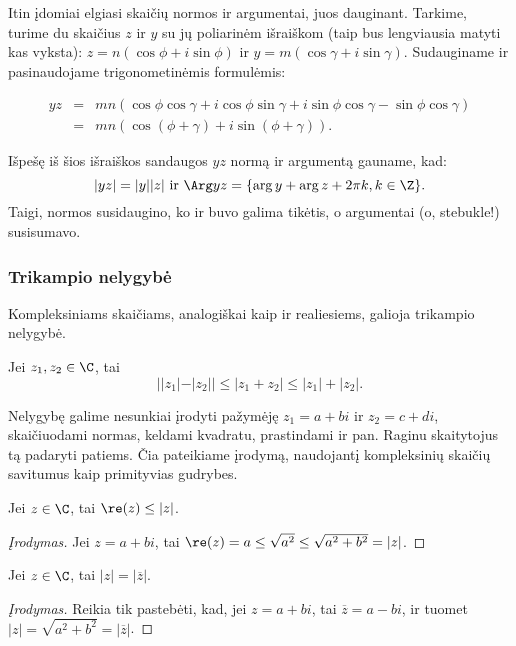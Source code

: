 Itin įdomiai elgiasi skaičių normos ir argumentai, juos dauginant. Tarkime, turime du skaičius $z$ ir $y$ su jų poliarinėm išraiškom (taip bus lengviausia matyti kas vyksta): $z=n(\cos\phi+i\sin\phi)$ ir $y=m(\cos\gamma +i\sin\gamma)$. Sudauginame ir pasinaudojame trigonometinėmis formulėmis:

\begin{eqnarray*}
yz&=&mn(\cos\phi\cos\gamma+i\cos\phi\sin\gamma+i\sin\phi\cos\gamma-\sin\phi\cos\gamma)\\
&=&mn(\cos(\phi+\gamma)+i\sin(\phi+\gamma)).
\end{eqnarray*}

Išpešę iš šios išraiškos sandaugos $yz$ normą ir argumentą gauname, kad: $$|yz|=|y||z|\text{ ir } \Arg yz=\{ \arg y+\arg z+2\pi k, k\in\Z\}.$$ Taigi, normos susidaugino, ko ir buvo galima tikėtis, o argumentai (o, stebukle!) susisumavo.  

\subsubsection{Trikampio nelygybė}

Kompleksiniams skaičiams, analogiškai kaip ir realiesiems, galioja trikampio nelygybė.
\begin{thm} Jei $z_1,z_2\in\C$, tai
$$||z_1|-|z_2||\leq |z_1+z_2|\leq |z_1|+|z_2|.$$
\end{thm}

Nelygybę galime nesunkiai įrodyti pažymėję $z_1=a+bi$ ir $z_2=c+di$, skaičiuodami normas, keldami kvadratu, prastindami ir pan. Raginu skaitytojus tą padaryti patiems. Čia pateikiame įrodymą, naudojantį kompleksinių skaičių savitumus kaip primityvias gudrybes.

\begin{teig}
Jei $z\in\C$, tai $\re(z)\leq |z|$.
\end{teig}

\begin{proof}[Įrodymas]
Jei $z=a+bi$, tai $\re(z)=a\leq \sqrt{a^2}\leq \sqrt{a^2+b^2}=|z|$.
\end{proof}

\begin{teig}
Jei $z\in\C$, tai $|z|=|\overline{z}|$.
\end{teig}

\begin{proof}[Įrodymas]
Reikia tik pastebėti, kad, jei $z=a+bi$, tai $\overline{z}=a-bi$, ir tuomet $|z|=\sqrt{a^2+b^2}=|\overline{z}|$.
\end{proof}

